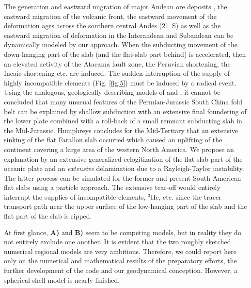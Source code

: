 \documentclass[twoside,10pt]{article}
\begin{document}
The generation and eastward migration of major Andean ore deposits \cite{Kay1999,Kay2001,Rosenbaum2005,Haschke2006}, the eastward migration of the volcanic front, the eastward movement of the deformation ages across the southern central Andes (21\textdegree~S) \cite{Elger2005,Oncken2006} as well as the eastward migration of deformation in the Interandean and Subandean \cite{Kley1996,Ege2004} can be dynamically modeled by our approach. 
When the subducting movement of the down-hanging part of the slab (and the flat-slab part behind) is accelerated, then an elevated activity of the Atacama fault zone, the Peruvian shortening, the Incaic shortening etc. are induced.
The sudden interruption of the supply of highly incompatible elements (Fig. \ref{fig:5}) must be induced by a radical event.
Using the analogous, geologically describing models of \cite[Fig.~4]{Li2007} and \cite[Fig.~7]{Humphreys2009}, it cannot be concluded that many unusual features of the Permian-Jurassic South China fold belt can be explained by shallow subduction with an extensive final foundering of the lower plate combined with a roll-back of a small remnant subducting slab in the Mid-Jurassic.
Humphreys \cite{Humphreys2009} concludes for the Mid-Tertiary that an extensive sinking of the flat Farallon slab occurred which caused an uplifting of the continent covering a large area of the western North America.
We propose an explanation by an extensive generalized eclogitization of the flat-slab part of the oceanic plate and an \emph{extensive} delamination due to a Rayleigh-Taylor instability.
The latter process can be simulated for the former and present South American flat slabs using a particle approach.
The extensive tear-off would entirely interrupt the supplies of incompatible elements, $^{3}$He, etc. since the tracer transport path near the upper surface of the low-hanging part of the slab and the flat part of the slab is ripped.

At first glance, \textbf{A)} and \textbf{B)} seem to be competing models, but in reality they do not entirely exclude one another. 
It is evident that the two roughly sketched numerical regional models are very ambitious. Therefore, we could report here only on the numerical and mathematical results of the preparatory efforts, the further development of the code and our geodynamical conception. However, a spherical-shell model is nearly finished.

\vspace{-2.5ex}
\end{document}
